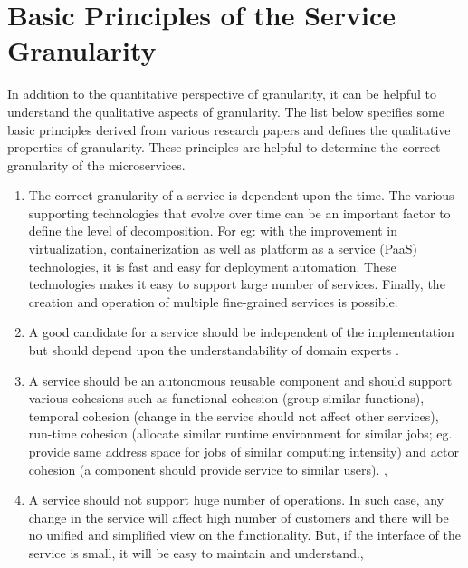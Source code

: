 \section{Basic Principles of the Service Granularity}\label{section:granularity/principles}
In addition to the quantitative perspective of granularity, it can be helpful to understand the qualitative aspects of granularity. The list below specifies some basic principles derived from various research papers and defines the qualitative properties of granularity. These principles are helpful to determine the correct granularity of the microservices.

\begin{enumerate}
\item The correct granularity of a service is dependent upon the time. The various supporting technologies that evolve over time can be an important factor to define the level of decomposition. For eg: with the improvement in virtualization, containerization as well as platform as a service (\acrshort{PaaS}) technologies, it is fast and easy for deployment automation. These technologies makes it easy to support large number of services. Finally, the creation and operation of multiple fine-grained services is possible.\cite{Peter-Herzum:2000aa}

\item A good candidate for a service should be independent of the implementation but should depend upon the understandability of domain experts \cite{Raf-Haesen:2015aa, Peter-Herzum:2000aa}.

\item A service should be an autonomous reusable component and should support various cohesions such as functional cohesion (group similar functions), temporal cohesion (change in the service should not affect other services), run-time cohesion (allocate similar runtime environment for similar jobs; eg. provide same address space for jobs of similar computing intensity) and actor cohesion (a component should provide service to similar users).
\cite{Raf-Haesen:2015aa}, \cite{Peter-Herzum:2000aa}

\item A service should not support huge number of operations. In such case, any change in the service will affect high number of customers and there will be no unified and simplified view on the functionality. But, if the interface of the service is small, it will be easy to maintain and understand.\cite{Raf-Haesen:2015aa}, \cite{Pierre-Reldin:2007aa}


\end{enumerate}
